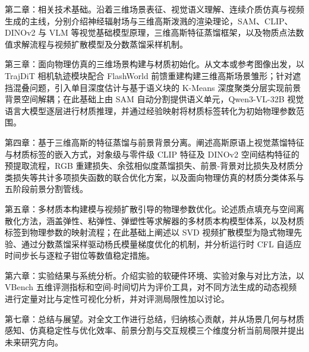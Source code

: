 第二章：相关技术基础。沿着三维场景表征、视觉语义理解、连续介质仿真与视频生成的主线，分别介绍神经辐射场与三维高斯泼溅的渲染理论，SAM、CLIP、DINOv2 与 VLM 等视觉基础模型原理，三维高斯特征蒸馏框架，以及物质点法数值求解流程与视频扩散模型及分数蒸馏采样机制。

第三章：面向物理仿真的三维场景构建与材质初始化。从文本或参考图像出发，以 TrajDiT\cite{director3d} 相机轨迹模块配合 FlashWorld 前馈重建构建三维高斯场景雏形；针对遮挡混叠问题，引入单目深度估计与基于语义块的 K-Means 深度聚类分层实现前景背景空间解耦；在此基础上由 SAM 自动分割提供语义单元，Qwen3-VL-32B 视觉语言大模型逐层进行材质推理，并通过经验映射将材质标签转化为初始物理参数范围。

第四章：基于三维高斯的特征蒸馏与前景背景分离。阐述高斯原语上视觉蒸馏特征与材质标签的嵌入方式，对象级与零件级 CLIP 特征及 DINOv2 空间结构特征的预提取流程，RGB 重建损失、余弦相似度蒸馏损失、前景-背景对比损失及材质分类损失等共计多项损失函数的联合优化方案，以及面向物理仿真的材质分类体系与五阶段前景分割管线。

第五章：多材质本构建模与视频扩散引导的物理参数优化。论述质点填充与空间离散化方法，涵盖弹性、粘弹性、弹塑性等求解器的多材质本构模型体系，以及材质标签到物理参数的映射流程；在此基础上阐述以 SVD 视频扩散模型为隐式物理先验、通过分数蒸馏采样驱动杨氏模量梯度优化的机制，并分析运行时 CFL 自适应时间步长与逐粒子钳位等数值稳定措施。

第六章：实验结果与系统分析。介绍实验的软硬件环境、实验对象与对比方法，以 VBench 五维评测指标和空间-时间切片为评价工具，对不同方法生成的动态视频进行定量对比与定性可视化分析，并对评测局限性加以讨论。

第七章：总结与展望。对全文工作进行总结，归纳核心贡献，并从场景几何与材质感知、仿真稳定性与优化效率、前景分割与交互规模三个维度分析当前局限并提出未来研究方向。
